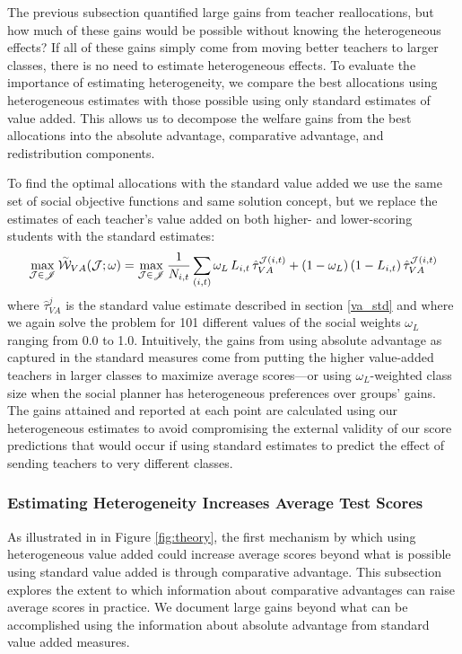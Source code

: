 \documentclass[12pt]{article}
\theoremstyle{definition}
\theoremstyle{definition}
\theoremstyle{definition}
\theoremstyle{definition}
\begin{document}
The previous subsection quantified large gains from teacher reallocations, but how much of these gains would be possible without knowing the heterogeneous effects? If all of these gains simply come from moving better teachers to larger classes, there is no need to estimate heterogeneous effects. To evaluate the importance of estimating heterogeneity, we compare the best allocations using heterogeneous estimates with those possible using only standard estimates of value added. This allows us to decompose the welfare gains from the best allocations into the absolute advantage, comparative advantage, and redistribution components.

To find the optimal allocations with the standard value added we use the same set of social objective functions and same solution concept, but we replace the estimates of each teacher's value added on both higher- and lower-scoring students with the standard estimates:
\begin{equation}\label{opt2}
\max_{\mathcal{J}\in\mathscr{J}} \accentset{\sim}{\mathcal{W}}_{VA}(\mathcal{J};\omega) = \max_{\mathcal{J}\in\mathscr{J}} \frac{1}{N_{i,t}}\sum_{(i,t)} \omega_{L} \,L_{i,t} \,\hat{\tau}^{\mathcal{J}(i,t)}_{VA}  +(1-\omega_{L}) \, (1-L_{i,t}) \, \hat{\tau}^{\mathcal{J}(i,t)}_{VA}
\end{equation}\noindent where $\hat{\tau}^j_{VA}$ is the standard value estimate described in section \ref{va_std} and where we again solve the problem for 101 different values of the social weights $\omega_L$ ranging from 0.0 to 1.0.  Intuitively, the gains from using absolute advantage as captured in the standard measures come from putting the higher value-added teachers in larger classes to maximize average scores---or using $\omega_L$-weighted class size when the social planner has heterogeneous preferences over groups' gains. The gains attained and reported at each point are calculated using our heterogeneous estimates to avoid compromising the external validity of our score predictions that would occur if using standard estimates to predict the effect of sending teachers to very different classes. %

\subsubsection{Estimating Heterogeneity Increases Average Test Scores}
As illustrated in in Figure \ref{fig:theory}, the first mechanism by which using heterogeneous value added could increase average scores beyond what is possible using standard value added is through comparative advantage. This subsection explores the extent to which information about comparative advantages can raise average scores in practice. We document large gains beyond what can be accomplished using the information about absolute advantage from standard value added measures.
\end{document}
